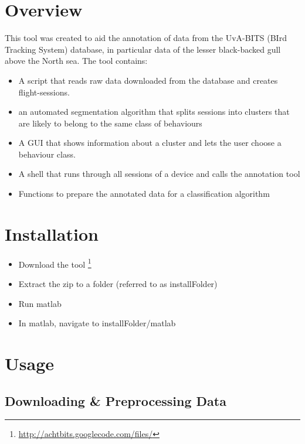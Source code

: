 \documentclass[a4paper, 11pt]{article}
\begin{document}

\vspace*{00mm}
\tableofcontents
\newpage

\section{Overview}

This tool was created to aid the annotation of data from the UvA-BITS (BIrd Tracking System) database, in particular data of the lesser black-backed gull above the North sea. The tool contains:
\begin{itemize}
\item
A script that reads raw data downloaded from the database and creates flight-sessions.
\item
an automated segmentation algorithm that splits sessions into clusters that are likely to belong to the same class of behaviours 
\item
A GUI that shows information about a cluster and lets the user choose a behaviour class.
\item
A shell that runs through all sessions of a device and calls the annotation tool
\item
Functions to prepare the annotated data for a classification algorithm
\end{itemize}

\section{Installation}
\begin{itemize}
	\item
	Download the tool \footnote{\url{http://achtbits.googlecode.com/files/}}
	\item
	Extract the zip to a folder (referred to as installFolder)
	\item
	Run matlab
	\item
	In matlab, navigate to installFolder/matlab
\end{itemize}
\section{Usage}
\subsection{Downloading \& Preprocessing Data}

 
\end{document}
